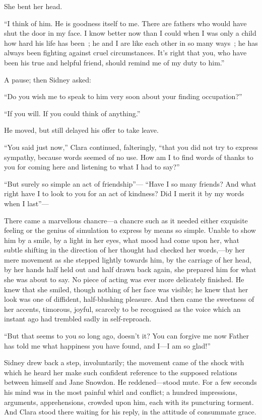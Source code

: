 She bent her head.

``I think of him. He is goodness itself to me. There are fathers who
would have shut the door in my face. I know better now than I could when
I was only a child how hard his life has been~; he and I are like each
other in so many ways~; he has always been fighting against cruel
circumstances. It's right that you, who have been his true and helpful
friend, should remind me of my duty to him.''

A pause; then Sidney asked:

``Do you wish me to speak to him very soon about your finding
occupation?''

``If you will. If you could think of anything.''

He moved, but still delayed his offer to take leave.

``You said just now,'' Clara continued, falteringly, ``that you did not
try to express sympathy, because words seemed of no use. How am I to
find words of thanks to you for coming here and listening to what I had
to say?''

``But surely so simple an act of friendship''---
{\protect\hypertarget{88}{}{}} ``Have I so many friends? And what right
have I to look to you for an act of kindness? Did I merit it by my words
when I last''---

There came a marvellous chancre---a chancre such as it needed either
exquisite feeling or the genius of simulation to express by means so
simple. Unable to show him by a smile, by a light in her eyes, what mood
had come upon her, what subtle shifting in the direction of her thought
had checked her words,---by her mere movement as she stepped lightly
towards him, by the carriage of her head, by her hands half held out and
half drawn back again, she prepared him for what she was about to say.
No piece of acting was ever more delicately finished. He knew that she
smiled, though nothing of her face was visible; he knew that her look
was one of diffident, half-blushing pleasure. And then came the
sweetness of her accents, timorous, joyful, scarcely to be recognised as
the voice which an instant ago had trembled sadly in self-reproach.

``But that seems to you so long ago, doesn't it? You can forgive me now
Father has told me what happiness you have found, and I---I am so
glad!''

{\protect\hypertarget{89}{}{}} Sidney drew back a step, involuntarily;
the movement came of the shock with which he heard her make such
confident reference to the supposed relations between himself and Jane
Snowdon. He reddened---stood mute. For a few seconds his mind was in the
most painful whirl and conflict; a hundred impressions, arguments,
apprehensions, crowded upon him, each with its puncturing torment. And
Clara stood there waiting for his reply, in the attitude of consummate
grace.

